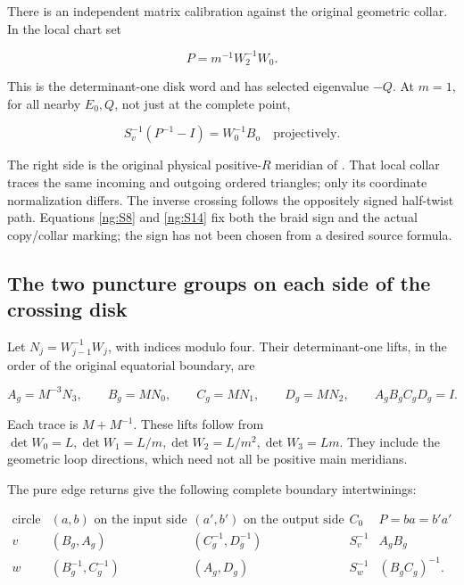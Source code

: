 There is an independent matrix calibration against the original
geometric collar. In the local chart set

\begin{equation}\label{ng:S13}
P=m^{-1}W_2^{-1}W_0.
\end{equation}

This is the determinant-one disk word and has selected
eigenvalue \(-Q\). At \(m=1\), for all nearby \(E_0,Q\),
not just at the complete point,

\begin{equation}\label{ng:S14}
S_v^{-1}(P^{-1}-I)=W_0^{-1}B_{\mathrm o}
                        \quad\text{projectively}.
\end{equation}

The right side is the original physical positive-\(R\)
meridian of \cite[Section~5, equations~(5.1)--(5.2)]{Strict}.
That local collar traces the same incoming and outgoing ordered
triangles; only its coordinate normalization differs.
The inverse crossing follows the oppositely signed half-twist path.
Equations \eqref{ng:S8} and \eqref{ng:S14} fix both the braid sign and the actual
copy/collar marking; the sign has not been chosen from a desired
source formula.

\subsection{The two puncture groups on each side of the crossing disk}\label{ng:the-full-ordered-boundary-groups-in-the-actual-edge-chart}

Let \(N_j=W_{j-1}^{-1}W_j\), with indices modulo four.
Their determinant-one lifts, in the order of the original
equatorial boundary, are

\begin{equation}\label{ng:S14a}
A_g=M^{-3}N_3,\qquad B_g=MN_0,\qquad
 C_g=MN_1,\qquad D_g=MN_2,\qquad
                    A_gB_gC_gD_g=I.
\end{equation}

Each trace is \(M+M^{-1}\). These lifts follow from
\(\det W_0=L,\det W_1=L/m,\det W_2=L/m^2,\det W_3=Lm\).
They include the geometric loop directions, which need not all be
positive main meridians.

The pure edge returns give the following complete boundary
intertwinings:

\begin{equation}\label{ng:S14b}
\begin{array}{c|c|c|c|c}
 \text{circle}&(a,b)\text{ on the input side}
 &(a',b')\text{ on the output side}&C_0&P=ba=b'a'\\ \hline
 v&(B_g,A_g)&(C_g^{-1},D_g^{-1})&S_v^{-1}&A_gB_g\\
 w&(B_g^{-1},C_g^{-1})&(A_g,D_g)&S_w^{-1}&(B_gC_g)^{-1}.
\end{array}
\end{equation}

